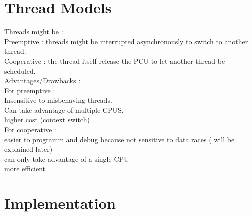 \documentclass[a4paper,10pt]{article}
\begin{document}
\section{Thread Models}

Threads might be :\\

Preemptive : threads might be interrupted asynchronously to switch to another thread. \\
Cooperative : the thread itself release the PCU to let another thread be scheduled.\\

Advantages/Drawbacks :\\

For preemptive : \\
Insensitive to misbehaving threads.\\
Can take advantage of multiple CPUS.\\
higher cost (context switch) \\

For cooperative :\\
easier to programm and debug  because not sensitive to data races ( will be explained later) \\
can only take advantage of a single CPU \\
more efficient


\section{Implementation}


 
\end{document}
